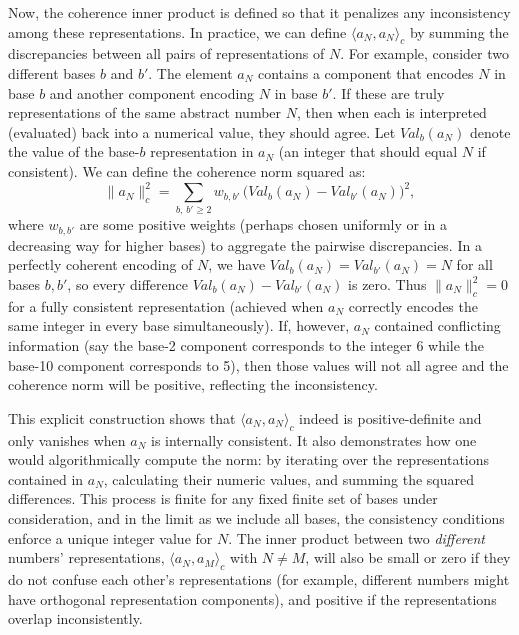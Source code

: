 \documentclass[11pt]{article}
\begin{document}
Now, the coherence inner product is defined so that it penalizes any inconsistency among these representations. In practice, we can define $\langle a_N, a_N\rangle_c$ by summing the discrepancies between all pairs of representations of $N$. For example, consider two different bases $b$ and $b'$. The element $a_N$ contains a component that encodes $N$ in base $b$ and another component encoding $N$ in base $b'$. If these are truly representations of the same abstract number $N$, then when each is interpreted (evaluated) back into a numerical value, they should agree. Let $Val_b(a_N)$ denote the value of the base-$b$ representation in $a_N$ (an integer that should equal $N$ if consistent). We can define the coherence norm squared as:
\[ 
\|a_N\|_c^2 = \sum_{b,\,b' \ge 2} w_{b,b'}\, \big( Val_b(a_N) - Val_{b'}(a_N)\big)^2,
\] 
where $w_{b,b'}$ are some positive weights (perhaps chosen uniformly or in a decreasing way for higher bases) to aggregate the pairwise discrepancies. In a perfectly coherent encoding of $N$, we have $Val_b(a_N) = Val_{b'}(a_N) = N$ for all bases $b,b'$, so every difference $Val_b(a_N) - Val_{b'}(a_N)$ is zero. Thus $\|a_N\|_c^2 = 0$ for a fully consistent representation (achieved when $a_N$ correctly encodes the same integer in every base simultaneously). If, however, $a_N$ contained conflicting information (say the base-2 component corresponds to the integer 6 while the base-10 component corresponds to 5), then those values will not all agree and the coherence norm will be positive, reflecting the inconsistency.

This explicit construction shows that $\langle a_N, a_N\rangle_c$ indeed is positive-definite and only vanishes when $a_N$ is internally consistent. It also demonstrates how one would algorithmically compute the norm: by iterating over the representations contained in $a_N$, calculating their numeric values, and summing the squared differences. This process is finite for any fixed finite set of bases under consideration, and in the limit as we include all bases, the consistency conditions enforce a unique integer value for $N$. The inner product between two \emph{different} numbers' representations, $\langle a_N, a_M\rangle_c$ with $N\neq M$, will also be small or zero if they do not confuse each other's representations (for example, different numbers might have orthogonal representation components), and positive if the representations overlap inconsistently.
\end{document}
